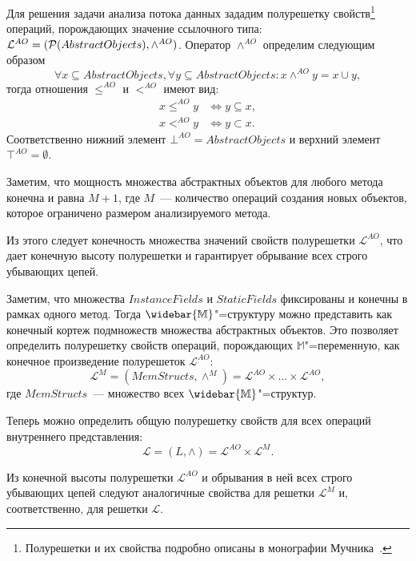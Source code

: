 \documentclass[14pt,titlepage,draft]{extarticle}
\newcommand{\M}{\ensuremath{\mathbb{M}}}
\newcommand{\Ms}{\ensuremath{\mathbb{\widebar{M}}}}
\newcommand{\Lattice}{\mathcal{L}}
\newcommand{\meet}{\wedge}
\begin{document}
    Для решения задачи анализа потока данных зададим полурешетку
    свойств\footnote{
      Полурешетки и их свойства подробно описаны в монографии
      Мучника~\cite{muchnick}.
    }
    операций, порождающих значение ссылочного типа:
    $\Lattice^{AO} = (\powerset{AbstractObjects}, \meet^{AO})$.
    Оператор $\meet^{AO}$ определим следующим образом
    \[
      \forall x \subseteq AbstractObjects, \forall y \subseteq AbstractObjects
      \colon
      x \meet^{AO} y = x \cup y,
    \]
    тогда отношения $\leq^{AO}$ и $<^{AO}$ имеют вид:
    \begin{align*}
      x \leq^{AO} y &\Leftrightarrow y \subseteq x, \\
      x <^{AO} y &\Leftrightarrow y \subset x.
    \end{align*}
    Соответственно нижний элемент $\bot^{AO} = AbstractObjects$
    и верхний элемент $\top^{AO} = \emptyset$.

    Заметим, что мощность множества абстрактных объектов для любого
    метода конечна и равна $M + 1$,
    где $M$~--- количество операций создания новых объектов, которое ограничено
    размером анализируемого метода.

    Из этого следует конечность множества значений свойств полурешетки
    $\Lattice^{AO}$, что дает конечную высоту полурешетки и гарантирует
    обрывание всех строго убывающих цепей.

    Заметим, что множества $InstanceFields$ и $StaticFields$ фиксированы и
    конечны в рамках одного метод.
    Тогда \Ms"=структуру можно представить как конечный кортеж подмножеств
    множества абстрактных объектов.
    Это позволяет определить полурешетку свойств операций, порождающих
    \M"=переменную, как конечное произведение полурешеток $\Lattice^{AO}$:
    \[\Lattice^M = (MemStructs, \meet^M) =
      \Lattice^{AO} \times \ldots \times \Lattice^{AO},\]
    где $MemStructs$~--- множество всех \Ms"=структур.

    Теперь можно определить общую полурешетку свойств для всех операций
    внутреннего представления:
    \[ \Lattice = (L, \meet) = \Lattice^{AO} \times \Lattice^M. \]

    Из конечной высоты полурешетки $\Lattice^{AO}$
    и обрывания в ней всех строго убывающих цепей следуют аналогичные свойства
    для решетки $\Lattice^M$ и, соответственно, для решетки $\Lattice$.
\end{document}
